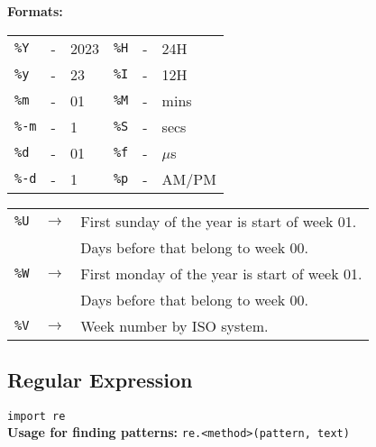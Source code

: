 \columnbreak

\textbf{Formats:}\\
\vspace{2pt}
\begin{tabular}{lcl|lcl}
    \hline
    \texttt{\%Y}  & - & 2023     &   \texttt{\%H}  & - &    24H\\
    \texttt{\%y}  & - & 23       &   \texttt{\%I}  & - &    12H\\
    \texttt{\%m}  & - & 01       &   \texttt{\%M}  & - &    mins\\
    \texttt{\%-m} & - & 1        &   \texttt{\%S}  & - &    secs\\
    \texttt{\%d}  & - & 01       &   \texttt{\%f}  & - &    $\mu$s\\
    \texttt{\%-d} & - & 1        &   \texttt{\%p}  & - &    AM/PM\\
    \hline
\end{tabular} 


\begin{tabularx}{\linewidth}{lcX}
    
\texttt{\%U}    & $\to$ & First sunday of the year is start of week 01.\\
                &       & Days before that belong to week 00.\\ 
\texttt{\%W}    & $\to$ & First monday of the year is start of week 01.\\
                &       & Days before that belong to week 00.\\ 
\texttt{\%V}    & $\to$ & Week number by ISO system.\\

\end{tabularx}

\subsection*{Regular Expression}

\texttt{import re}\\
\textbf{Usage for finding patterns:} \texttt{re.<method>(pattern, text)}\\

